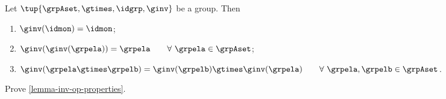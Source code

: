 \begin{lemma}\label{lemma-inv-op-properties}
Let $\tup{\grpAset, \gtimes, \idgrp, \ginv}$ be a group. Then 
\begin{enumerate}
\item\label{eq:group-neutral-invariant} $\ginv(\idmon) = \idmon$;
\item\label{eq:group-inverse-inverse}  $ \ginv(\ginv(\grpela)) = \grpela \quad \quad \forall \  \grpela \in \grpAset$;
\item\label{eq:group-inverse-of-composition} $\ginv(\grpela \gtimes \grpelb ) = \ginv(\grpelb) \gtimes \ginv(\grpela) \quad \quad \forall \ \grpela, \grpelb \in \grpAset$.
\end{enumerate}
\end{lemma}

\begin{exercise}
Prove \cref{lemma-inv-op-properties}. 
\end{exercise}






